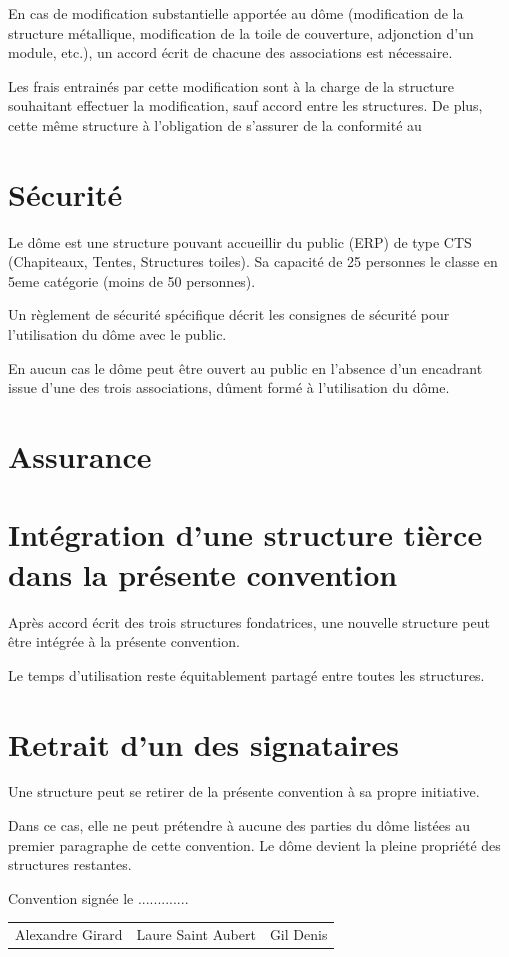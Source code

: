 \documentclass[a4paper,12pt]{article}
\newcommand{\presidentplasci}{Gil Denis}
\newcommand{\presidentincognu}{Laure Saint Aubert}
\newcommand{\presidenttetalab}{Alexandre Girard}
\begin{document}
En cas de modification substantielle apportée au dôme (modification de la
structure métallique, modification de la toile de couverture, adjonction d'un
module, etc.), un accord écrit de chacune des associations est nécessaire.

Les frais entrainés par cette modification sont à la charge de la structure
souhaitant effectuer la  modification, sauf accord entre les structures. De
plus, cette même structure à l'obligation de s'assurer de la conformité au 

\section{Sécurité}

Le dôme est une structure pouvant accueillir du public (ERP) de type CTS
(Chapiteaux, Tentes, Structures toiles). Sa capacité de 25 personnes le classe
en 5eme catégorie (moins de 50 personnes).

Un règlement de sécurité spécifique décrit les consignes de sécurité pour
l'utilisation du dôme avec le public.

En aucun cas le dôme peut être ouvert au public en l'absence d'un encadrant
issue d'une des trois associations, dûment formé à l'utilisation du dôme.

\section{Assurance}


\section{Intégration d'une structure tièrce dans la présente convention}

Après accord écrit des trois structures fondatrices, une nouvelle structure
peut être intégrée à la présente convention.

Le temps d'utilisation reste équitablement partagé entre toutes les structures.

\section{Retrait d'un des signataires}

Une structure peut se retirer de la présente convention à sa propre initiative.

Dans ce cas, elle ne peut prétendre à aucune des parties du dôme listées au
premier paragraphe de cette convention. Le dôme devient la pleine propriété des
structures restantes.

Convention signée le .............


\begin{center}
\begin{tabular}{ccc}
\presidenttetalab & \presidentincognu & \presidentplasci    
\end{tabular}
\end{center}
\end{document}
